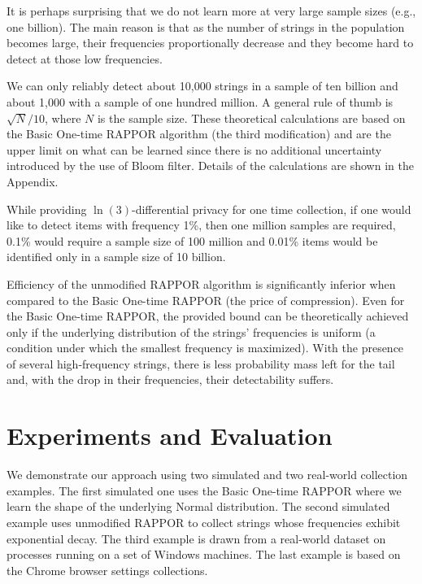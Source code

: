\documentclass{sig-alternate-2013}
\newcommand\RAPPOR{{RAPPOR}}
\begin{document}
It is perhaps surprising that we do not learn more at very large sample sizes (e.g., one billion). The main reason is that as the number of strings in the population becomes large, their frequencies proportionally decrease and they become hard to detect at those low frequencies.


We can only reliably detect about 10,000 strings in a sample of ten billion and about 1,000 with a sample of one hundred million. A general rule of thumb is $\sqrt{N}/10$, where $N$ is the sample size. These theoretical calculations are based on the Basic One-time \RAPPOR{} algorithm (the third modification) and are the upper limit on what can be learned since there is no additional uncertainty introduced by the use of Bloom filter. Details of the calculations are shown in the Appendix.

While providing $\ln(3)$-differential privacy for one time collection, if one would like to detect items with frequency 1\%, then one million samples are required,
0.1\% would require a sample size of 100 million and 0.01\% items would be identified only in a sample size of 10 billion. 

Efficiency of the unmodified \RAPPOR{} algorithm is significantly inferior when compared to the Basic One-time \RAPPOR{} (the price of compression). Even for the Basic One-time \RAPPOR{}, the provided bound can be theoretically achieved only if the underlying distribution of the strings' frequencies is uniform (a condition under which the smallest frequency is maximized). With the presence of several high-frequency strings, there is less probability mass left for the tail and, with the drop in their frequencies, their detectability suffers.

\section{Experiments and Evaluation}
We demonstrate our approach using two simulated and two real-world collection examples. The first simulated one uses the Basic One-time \RAPPOR{} where we learn the shape of the underlying Normal distribution. The second simulated example uses unmodified \RAPPOR{} to collect strings whose frequencies exhibit exponential decay. The third example is drawn from a real-world dataset on processes running on a set of Windows machines. The last example is based on the Chrome browser settings collections. 
\end{document}
